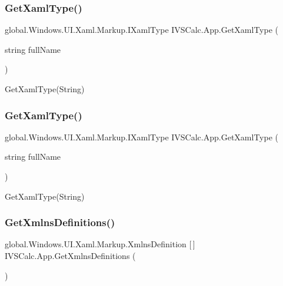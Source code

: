 \subsubsection{\texorpdfstring{Get\+Xaml\+Type()}{GetXamlType()}\hspace{0.1cm}{\footnotesize\ttfamily [9/10]}}
{\footnotesize\ttfamily global.\+Windows.\+U\+I.\+Xaml.\+Markup.\+I\+Xaml\+Type I\+V\+S\+Calc.\+App.\+Get\+Xaml\+Type (\begin{DoxyParamCaption}\item[{string}]{full\+Name }\end{DoxyParamCaption})}



Get\+Xaml\+Type(\+String) 

\mbox{\label{class_i_v_s_calc_1_1_app_a0ecb22e44dc1f88762844f47b18f2e7b}} 
\subsubsection{\texorpdfstring{Get\+Xaml\+Type()}{GetXamlType()}\hspace{0.1cm}{\footnotesize\ttfamily [10/10]}}
{\footnotesize\ttfamily global.\+Windows.\+U\+I.\+Xaml.\+Markup.\+I\+Xaml\+Type I\+V\+S\+Calc.\+App.\+Get\+Xaml\+Type (\begin{DoxyParamCaption}\item[{string}]{full\+Name }\end{DoxyParamCaption})}



Get\+Xaml\+Type(\+String) 

\mbox{\label{class_i_v_s_calc_1_1_app_a8f8ce062718726306de29d798b53bdba}} 
\subsubsection{\texorpdfstring{Get\+Xmlns\+Definitions()}{GetXmlnsDefinitions()}\hspace{0.1cm}{\footnotesize\ttfamily [1/5]}}
{\footnotesize\ttfamily global.\+Windows.\+U\+I.\+Xaml.\+Markup.\+Xmlns\+Definition \mbox{[}$\,$\mbox{]} I\+V\+S\+Calc.\+App.\+Get\+Xmlns\+Definitions (\begin{DoxyParamCaption}{ }\end{DoxyParamCaption})}



